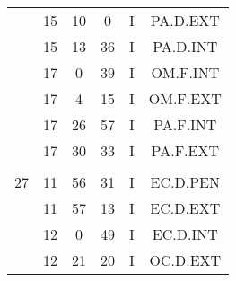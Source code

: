 \documentclass[12pt, a4paper]{article}
\begin{document}
\begin{multicols}{3}
{\begin{tabular}{c c c c c c}
	 	 	 	 & 15 & 10 & 0 & I & PA.D.EXT\\%
	 	 	 	 & 15 & 13 & 36 & I & PA.D.INT\\%
	 	 	 	 & 17 & 0 & 39 & I & OM.F.INT\\%
	 	 	 	 & 17 & 4 & 15 & I & OM.F.EXT\\%
	 	 	 	 & 17 & 26 & 57 & I & PA.F.INT\\%
	 	 	 	 & 17 & 30 & 33 & I & PA.F.EXT\\%
	 	 	 	 & & & & & \\%
	 	 	 	27 & 11 & 56 & 31 & I & EC.D.PEN\\%
	 	 	 	 & 11 & 57 & 13 & I & EC.D.EXT\\%
	 	 	 	 & 12 & 0 & 49 & I & EC.D.INT\\%
	 	 	 	 & 12 & 21 & 20 & I & OC.D.EXT\\%
	 	 \end{tabular}
 	}
\end{multicols}
\end{document}
